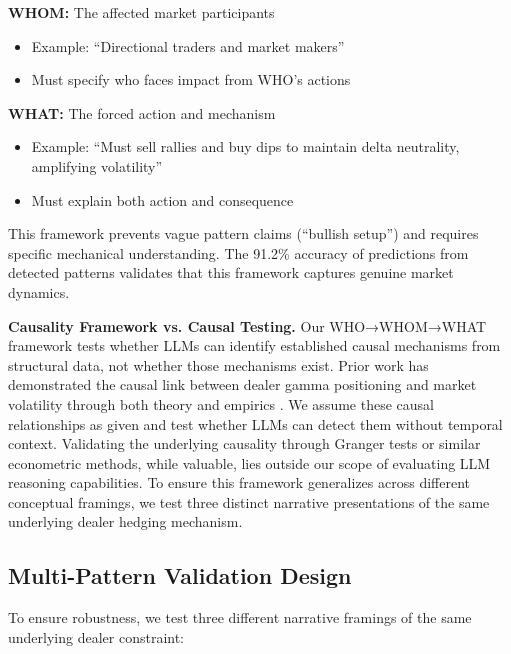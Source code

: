 \textbf{WHOM:} The affected market participants
\begin{itemize}
\item Example: ``Directional traders and market makers''
\item Must specify who faces impact from WHO's actions
\end{itemize}

\textbf{WHAT:} The forced action and mechanism
\begin{itemize}
\item Example: ``Must sell rallies and buy dips to maintain delta neutrality, amplifying volatility''
\item Must explain both action and consequence
\end{itemize}

This framework prevents vague pattern claims (``bullish setup'') and requires specific mechanical understanding. The 91.2\% accuracy of predictions from detected patterns validates that this framework captures genuine market dynamics.

\textbf{Causality Framework vs. Causal Testing.} Our WHO→WHOM→WHAT
framework tests whether LLMs can identify established causal mechanisms
from structural data, not whether those mechanisms exist. Prior work
has demonstrated the causal link between dealer gamma positioning and
market volatility through both theory \cite{frey1997market} and
empirics \cite{ni2022}. We assume these causal relationships as given
and test whether LLMs can detect them without temporal context.
Validating the underlying causality through Granger tests or similar
econometric methods, while valuable, lies outside our scope of
evaluating LLM reasoning capabilities.
To ensure this framework generalizes across different conceptual
framings, we test three distinct narrative presentations of the
same underlying dealer hedging mechanism.

\subsection{Multi-Pattern Validation Design}

To ensure robustness, we test three different narrative framings of the same underlying dealer constraint:

